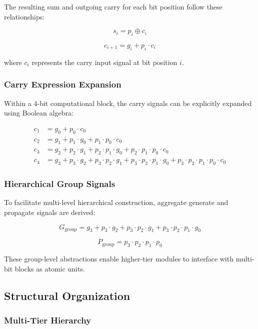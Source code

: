 \documentclass[a4paper, 11pt]{article}
\begin{document}
The resulting sum and outgoing carry for each bit position follow these relationships:

$$s_i = p_i \oplus c_i$$

$$c_{i+1} = g_i + p_i \cdot c_i$$

where $c_i$ represents the carry input signal at bit position $i$.

\subsubsection{Carry Expression Expansion}

Within a 4-bit computational block, the carry signals can be explicitly expanded using Boolean algebra:

\begin{align}
c_1 &= g_0 + p_0 \cdot c_0 \\
c_2 &= g_1 + p_1 \cdot g_0 + p_1 \cdot p_0 \cdot c_0 \\
c_3 &= g_2 + p_2 \cdot g_1 + p_2 \cdot p_1 \cdot g_0 + p_2 \cdot p_1 \cdot p_0 \cdot c_0 \\
c_4 &= g_3 + p_3 \cdot g_2 + p_3 \cdot p_2 \cdot g_1 + p_3 \cdot p_2 \cdot p_1 \cdot g_0 + p_3 \cdot p_2 \cdot p_1 \cdot p_0 \cdot c_0
\end{align}

\subsubsection{Hierarchical Group Signals}

To facilitate multi-level hierarchical construction, aggregate generate and propagate signals are derived:

$$G_{\text{group}} = g_3 + p_3 \cdot g_2 + p_3 \cdot p_2 \cdot g_1 + p_3 \cdot p_2 \cdot p_1 \cdot g_0$$

$$P_{\text{group}} = p_3 \cdot p_2 \cdot p_1 \cdot p_0$$

These group-level abstractions enable higher-tier modules to interface with multi-bit blocks as atomic units.

\subsection{Structural Organization}

\subsubsection{Multi-Tier Hierarchy}
\end{document}
